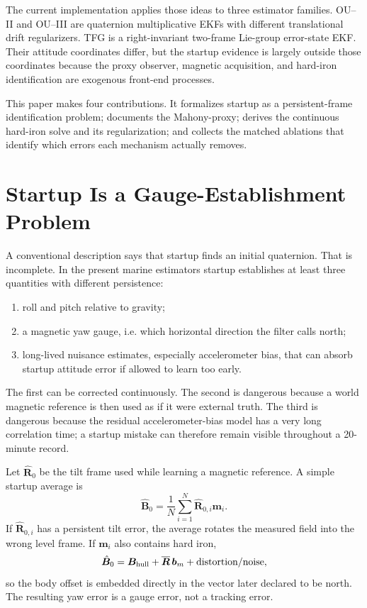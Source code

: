 \documentclass[conference]{IEEEtran}
\DeclareRobustCommand{\vct}[1]{\bm{#1}}
\DeclareRobustCommand{\mat}[1]{\bm{#1}}
\begin{document}
The current implementation applies those ideas to three estimator families.  OU--II
and OU--III are quaternion multiplicative EKFs with different translational drift
regularizers.  TFG is a right-invariant two-frame Lie-group error-state EKF.  Their
attitude coordinates differ, but the startup evidence is largely outside those
coordinates because the proxy observer, magnetic acquisition, and hard-iron
identification are exogenous front-end processes.

This paper makes four contributions.  It formalizes startup as a persistent-frame
identification problem; documents the Mahony-proxy;
derives the continuous hard-iron solve and its regularization; and collects the
matched ablations that identify which errors each mechanism actually removes.

\section{Startup Is a Gauge-Establishment Problem}
\label{sec:gauge-problem}

A conventional description says that startup finds an initial quaternion.  That is
incomplete.  In the present marine estimators startup establishes at least three
quantities with different persistence:
\begin{enumerate}
  \item roll and pitch relative to gravity;
  \item a magnetic yaw gauge, i.e. which horizontal direction the filter calls north;
  \item long-lived nuisance estimates, especially accelerometer bias, that can absorb
        startup attitude error if allowed to learn too early.
\end{enumerate}
The first can be corrected continuously.  The second is dangerous because a world
magnetic reference is then used as if it were external truth.  The third is dangerous
because the residual accelerometer-bias model has a very long correlation time; a
startup mistake can therefore remain visible throughout a 20-minute record.

Let $\hat{\mat R}_{0}$ be the tilt frame used while learning a magnetic reference.
A simple startup average is
\begin{equation}
\hat{\vct B}_{0}
 = \frac{1}{N}\sum_{i=1}^{N}\hat{\mat R}_{0,i}\vct m_i.
\label{eq:reference-average}
\end{equation}
If $\hat{\mat R}_{0,i}$ has a persistent tilt error, the average rotates the measured
field into the wrong level frame.  If $\vct m_i$ also contains hard iron,
\begin{equation}
\hat{\vct B}_{0}
 = \vct B_{\rm hull}
 + \overline{\mat R}\,\vct b_m
 + \text{distortion/noise},
\label{eq:hardiron-in-reference}
\end{equation}
so the body offset is embedded directly in the vector later declared to be north.
The resulting yaw error is a gauge error, not a tracking error.
\end{document}
